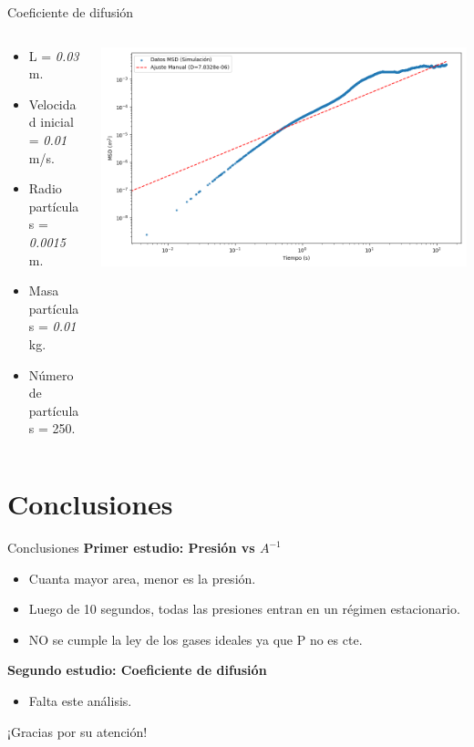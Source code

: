 \documentclass{beamer}
\begin{document}
\begin{frame}{Coeficiente de difusión}
  \begin{columns}
    \begin{column}{0.30\textwidth}
      \scriptsize {}
      \begin{itemize}
        \item L = \textit{0.03} m. 
        \item Velocidad inicial = \textit{0.01} m/s.
        \item Radio partículas = \textit{0.0015} m.
        \item Masa partículas = \textit{0.01} kg.
        \item Número de partículas = 250.
      \end{itemize}
    \end{column}
    \begin{column}{0.70\textwidth}
      \includegraphics[width=1.10\linewidth]{photoMaterial/MSD_03.png}
    \end{column}
  \end{columns}
\end{frame}

\section{Conclusiones}
\begin{frame}{Conclusiones}
  \textbf{Primer estudio: Presión vs $A^{-1}$}
  \begin{itemize}
    \item Cuanta mayor area, menor es la presión.
    \item Luego de 10 segundos, todas las presiones entran en un régimen estacionario.
    \item NO se cumple la ley de los gases ideales ya que P no es cte.
  \end{itemize}
  \textbf{Segundo estudio: Coeficiente de difusión}
  \begin{itemize}
    \item Falta este análisis.
  \end{itemize}
\end{frame}

\begin{frame}{}
  \centering
  \Huge ¡Gracias por su atención!
\end{frame}
\end{document}
